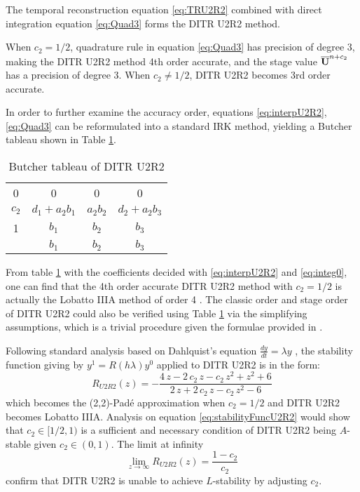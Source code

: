 \documentclass[preprint,12pt]{elsarticle}
\begin{document}
The temporal reconstruction equation \eqref{eq:TRU2R2}
combined with direct integration equation \eqref{eq:Quad3}
forms the DITR U2R2 method.

When $c_2=1/2$, quadrature rule in equation \eqref{eq:Quad3} has precision
of degree 3, making the DITR U2R2 method 4th order accurate,
and the stage value $\overline{\mathbf{U}}^{n+c_2}$ has a precision of degree 3.
When $c_2\neq1/2$, DITR U2R2 becomes 3rd order accurate.

In order to further examine the accuracy order,
equations \eqref{eq:interpU2R2}, \eqref{eq:Quad3}
can be reformulated into a standard IRK method,
yielding a Butcher tableau shown in Table \ref{tab:U2R2Butcher}.
\begin{table}[htbp]
    \centering
    \begin{tabular}{c|ccc}
        0     & 0              & 0        & 0              \\
        $c_2$ & $d_1 + a_2b_1$ & $a_2b_2$ & $d_2 + a_2b_3$ \\
        1     & $b_1$          & $b_2$    & $b_3$          \\ \hline
              & $b_1$          & $b_2$    & $b_3$
    \end{tabular}
    \caption{Butcher tableau of DITR U2R2}
    \label{tab:U2R2Butcher}
\end{table}

From table \ref{tab:U2R2Butcher} with the coefficients
decided with \eqref{eq:interpU2R2} and \eqref{eq:integ0},
one can find that the 4th order accurate
DITR U2R2 method with $c_2=1/2$
is actually the Lobatto IIIA method
of order 4 \cite{wanner1996solving}.
The classic order and stage order of DITR U2R2 could
also be verified using Table \ref{tab:U2R2Butcher} via
the simplifying assumptions, which is a trivial procedure
given the formulae provided in \cite{wanner1996solving}.

Following standard analysis based on Dahlquist's equation
$\frac{dy}{dt} = \lambda y$ \cite{wanner1996solving},
the stability function giving by $y^{1}=R(h\lambda)y^0$
applied to DITR U2R2 is in the form:
\begin{equation}
    \label{eq:stabilityFuncU2R2}
    R_{U2R2}(z) = -\frac{4\,z-2\,c_{2}\,z-c_{2}\,z^2+z^2+6}{2\,z+2\,c_{2}\,z-c_{2}\,z^2-6}
\end{equation}
which becomes the (2,2)-Pad{\'e} approximation when $c_2=1/2$ and
DITR U2R2 becomes Lobatto IIIA.
Analysis on equation \eqref{eq:stabilityFuncU2R2}
would show that $c_2\in[1/2,1)$ is a sufficient and necessary
condition of DITR U2R2 being $A$-stable given $c_2\in(0,1)$.
The limit at infinity
\begin{equation}
    \lim_{z\rightarrow\infty}R_{U2R2}(z) = \frac{1-c_2}{c_2}
\end{equation}
confirm that DITR U2R2 is unable to achieve $L$-stability
by adjusting $c_2$.
\end{document}
